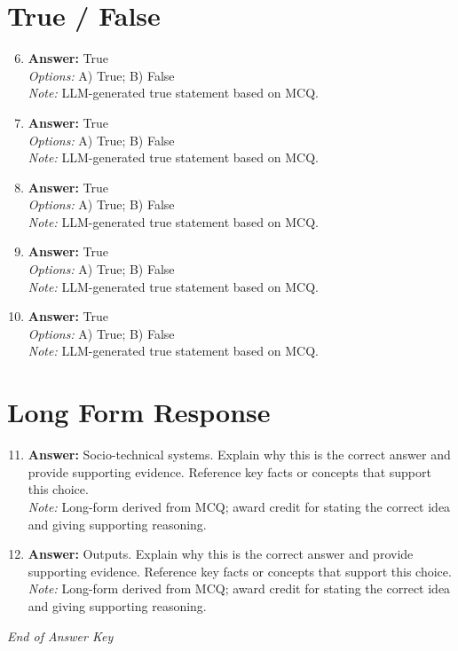 \documentclass[12pt]{article}
\begin{document}
\section*{True / False}
\begin{enumerate}[label=\arabic*.]
\setcounter{enumi}{5}
\item \textbf{Answer:} True
\\ \textit{Options:} A) True; B) False
\\ \textit{Note:} LLM-generated true statement based on MCQ.
\item \textbf{Answer:} True
\\ \textit{Options:} A) True; B) False
\\ \textit{Note:} LLM-generated true statement based on MCQ.
\item \textbf{Answer:} True
\\ \textit{Options:} A) True; B) False
\\ \textit{Note:} LLM-generated true statement based on MCQ.
\item \textbf{Answer:} True
\\ \textit{Options:} A) True; B) False
\\ \textit{Note:} LLM-generated true statement based on MCQ.
\item \textbf{Answer:} True
\\ \textit{Options:} A) True; B) False
\\ \textit{Note:} LLM-generated true statement based on MCQ.
\end{enumerate}

\section*{Long Form Response}
\begin{enumerate}[label=\arabic*.]
\setcounter{enumi}{10}
\item \textbf{Answer:} Socio-technical systems. Explain why this is the correct answer and provide supporting evidence. Reference key facts or concepts that support this choice.
\\ \textit{Note:} Long-form derived from MCQ; award credit for stating the correct idea and giving supporting reasoning.
\item \textbf{Answer:} Outputs. Explain why this is the correct answer and provide supporting evidence. Reference key facts or concepts that support this choice.
\\ \textit{Note:} Long-form derived from MCQ; award credit for stating the correct idea and giving supporting reasoning.
\end{enumerate}

\vfill
\noindent\textit{End of Answer Key}
\end{document}
